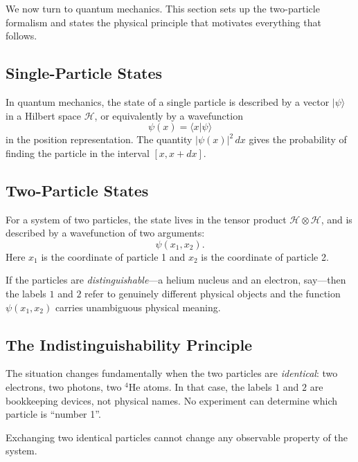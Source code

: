 \documentclass[11pt,a4paper]{article}
\newcommand{\hilb}{\mathcal{H}}
\newenvironment{keyidea}{%
  \begin{tcolorbox}[colback=themeblue!7, colframe=themeblue!50,
    title=Key Idea, fonttitle=\bfseries\small\color{themeblue}]
}{%
  \end{tcolorbox}
}
\begin{document}
We now turn to quantum mechanics.  This section sets up the two-particle
formalism and states the physical principle that motivates everything that
follows.

\subsection{Single-Particle States}

In quantum mechanics, the state of a single particle is described by a vector
$|\psi\rangle$ in a Hilbert space $\hilb$, or equivalently by a wavefunction
\[
  \psi(x) = \langle x | \psi \rangle
\]
in the position representation.  The quantity $|\psi(x)|^2\,dx$ gives the
probability of finding the particle in the interval $[x, x+dx]$.

\subsection{Two-Particle States}

For a system of two particles, the state lives in the tensor product
$\hilb \otimes \hilb$, and is described by a wavefunction of two arguments:
\[
  \psi(x_1, x_2).
\]
Here $x_1$ is the coordinate of particle 1 and $x_2$ is the coordinate of
particle 2.

If the particles are \emph{distinguishable}---a helium nucleus and an
electron, say---then the labels $1$ and $2$ refer to genuinely different
physical objects and the function $\psi(x_1,x_2)$ carries unambiguous physical
meaning.

\subsection{The Indistinguishability Principle}

The situation changes fundamentally when the two particles are \emph{identical}:
two electrons, two photons, two $^4\text{He}$ atoms.  In that case, the labels
$1$ and $2$ are bookkeeping devices, not physical names.  No experiment can
determine which particle is ``number 1''.

\begin{keyidea}
  Exchanging two identical particles cannot change any observable property
  of the system.
\end{keyidea}
\end{document}
